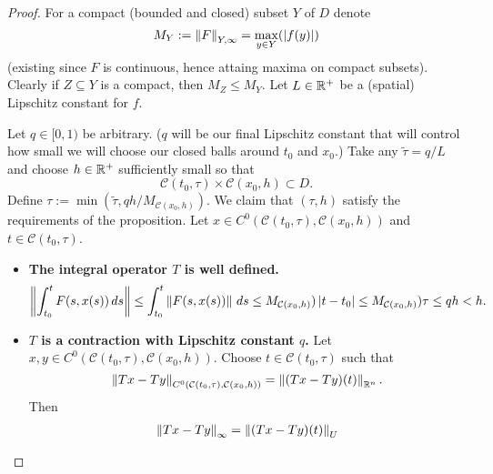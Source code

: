 \begin{proof}
  For a compact (bounded and closed) subset $Y$ of $D$ denote
  \begin{equation}
    M_Y := \left\lVert F\right\rVert_{Y, \infty} = \max_{y \in Y}(\left\lvert f(y)\right\rvert)
  \end{equation}
  (existing since $F$ is continuous, hence attaing maxima on compact subsets).
  Clearly if $Z \subseteq Y$ is a compact, then $M_Z \leq M_Y$.
  Let $L \in \mathbb{R}^+$ be a (spatial) Lipschitz constant for $f$.

  Let $q \in [0, 1)$ be arbitrary.
  ($q$ will be our final Lipschitz constant that will control how small we will
  choose our closed balls around $t_0$ and $x_0$.)
  Take any $\tilde{\tau} = q / L$ and choose $h \in \mathbb{R}^+$ sufficiently small so
  that
  \begin{equation}
    \mathcal{C}(t_0, \tau) \times \mathcal{C}(x_0, h) \subset D.
  \end{equation}
  Define $\tau := \min(\tilde{\tau}, q h / M_{\mathcal{C}(x_0, h)})$.
  We claim that $(\tau, h)$ satisfy the requirements of the proposition.
  Let
    $x \in C^0(\mathcal{C}(t_0, \tau), \mathcal{C}(x_0, h))$ and
    $t \in \mathcal{C}(t_0, \tau)$.
  \begin{itemize}
    \item
      \textbf{The integral operator $T$ is well defined.}
      \begin{equation}
        \begin{split}
          \left\lVert\int_{t_0}^t F(s, x(s))\, d s\right\rVert
          \leq \int_{t_0}^{t} \left\lVert F(s, x(s))\right\rVert\, d s
          \leq M_{\mathcal{C}(x_0, h)}) \left\lvert t - t_0\right\rvert
          \leq M_{\mathcal{C}(x_0, h)}) \tau
          \leq q h
          < h.
        \end{split}
      \end{equation}
    \item
      \textbf{$T$ is a contraction with Lipschitz constant $q$.}
      Let $x, y \in C^0(\mathcal{C}(t_0, \tau), \mathcal{C}(x_0, h))$.
      Choose $t \in \mathcal{C}(t_0, \tau)$ such that
      \begin{equation}
        \left\lVert T x - T y\right\rVert_{C^0(\mathcal{C}(t_0, \tau), \mathcal{C}(x_0, h))}
        = \left\lVert(T x - T y)(t)\right\rVert_{\mathbb{R}^n}.
      \end{equation}
      Then
      \begin{equation}
        \begin{split}
          \norm{T x - T y}_\infty
          & = \norm{(T x - T y)(t)}_U \\

\end{split}
\end{equation}
\end{itemize}
\end{proof}
